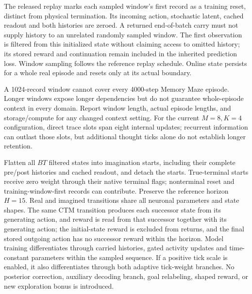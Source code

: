 \documentclass{article}
\begin{document}
The released replay marks each sampled window's first record as a training reset, distinct from physical termination. Its incoming action, stochastic latent, cached readout and both histories are zeroed. A returned end-of-batch carry must not supply history to an unrelated randomly sampled window. The first observation is filtered from this initialized state without claiming access to omitted history; its stored reward and continuation remain included in the inherited prediction loss. Window sampling follows the reference replay schedule. Online state persists for a whole real episode and resets only at its actual boundary.

A 1024-record window cannot cover every 4000-step Memory Maze episode. Longer windows expose longer dependencies but do not guarantee whole-episode context in every domain. Report window length, actual episode lengths, and storage/compute for any changed context setting. For the current $M=8,K=4$ configuration, direct trace slots span eight internal updates; recurrent information can outlast those slots, but additional thought ticks alone do not establish longer retention.

Flatten all $B T$ filtered states into imagination starts, including their complete pre/post histories and cached readout, and detach the starts. True-terminal starts receive zero weight through their native terminal flags; nonterminal reset and training-window-first records can contribute. Preserve the reference horizon $H=15$. Real and imagined transitions share all neuronal parameters and state shapes. The same CTM transition produces each successor state from its generating action, and reward is read from that successor together with its generating action; the initial-state reward is excluded from returns, and the final stored outgoing action has no successor reward within the horizon. Model training differentiates through carried histories, gated activity updates and time-constant parameters within the sampled sequence. If a positive tick scale is enabled, it also differentiates through both adaptive tick-weight branches. No posterior correction, auxiliary decoding branch, goal relabeling, shaped reward, or new exploration bonus is introduced.
\end{document}
